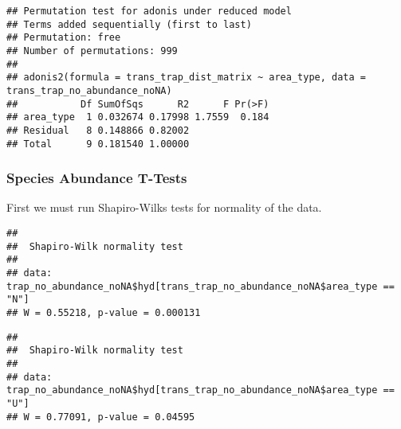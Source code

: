 \documentclass[
]{article}
\newenvironment{Shaded}{\begin{snugshade}}{\end{snugshade}}
\newcommand{\FunctionTok}[1]{\textcolor[rgb]{0.13,0.29,0.53}{\textbf{#1}}}
\newcommand{\NormalTok}[1]{#1}
\newcommand{\SpecialCharTok}[1]{\textcolor[rgb]{0.81,0.36,0.00}{\textbf{#1}}}
\newcommand{\StringTok}[1]{\textcolor[rgb]{0.31,0.60,0.02}{#1}}
\begin{document}
\begin{verbatim}
## Permutation test for adonis under reduced model
## Terms added sequentially (first to last)
## Permutation: free
## Number of permutations: 999
## 
## adonis2(formula = trans_trap_dist_matrix ~ area_type, data = trans_trap_no_abundance_noNA)
##           Df SumOfSqs      R2      F Pr(>F)
## area_type  1 0.032674 0.17998 1.7559  0.184
## Residual   8 0.148866 0.82002              
## Total      9 0.181540 1.00000
\end{verbatim}

\hypertarget{species-abundance-t-tests}{%
\subsubsection{Species Abundance
T-Tests}\label{species-abundance-t-tests}}

First we must run Shapiro-Wilks tests for normality of the data.

\begin{Shaded}
\end{Shaded}

\begin{verbatim}
## 
##  Shapiro-Wilk normality test
## 
## data:  trap_no_abundance_noNA$hyd[trans_trap_no_abundance_noNA$area_type == "N"]
## W = 0.55218, p-value = 0.000131
\end{verbatim}

\begin{Shaded}
\end{Shaded}

\begin{verbatim}
## 
##  Shapiro-Wilk normality test
## 
## data:  trap_no_abundance_noNA$hyd[trans_trap_no_abundance_noNA$area_type == "U"]
## W = 0.77091, p-value = 0.04595
\end{verbatim}
\end{document}
